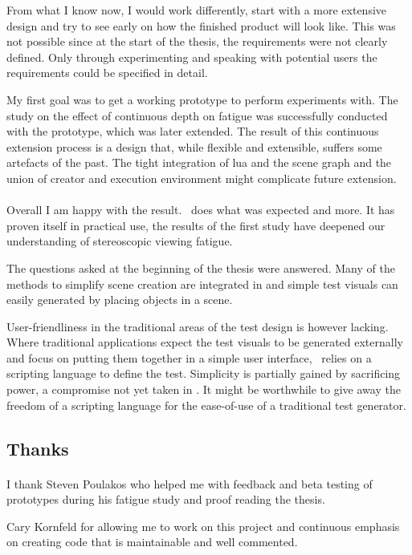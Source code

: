 From what I know now, I would work differently, start with a more extensive design and try to see early on how the finished product will look like.
This was not possible since at the start of the thesis, the requirements were not clearly defined.
Only through experimenting and speaking with potential users the requirements could be specified in detail.

My first goal was to get a working prototype to perform experiments with.
The study on the effect of continuous depth on fatigue was successfully conducted with the prototype, which was later extended.
The result of this continuous extension process is a design that, while flexible and extensible, suffers some artefacts of the past.
The tight integration of lua and the scene graph and the union of creator and execution environment might complicate future extension.

\paragraph{}
Overall I am happy with the result.
\ER\ does what was expected and more.
It has proven itself in practical use, the results of the first study have deepened our understanding of stereoscopic viewing fatigue.

The questions asked at the beginning of the thesis were answered.
Many of the methods to simplify scene creation are integrated in \ER and
simple test visuals can easily generated by placing objects in a scene.

User-friendliness in the traditional areas of the test design is however lacking.
Where traditional applications expect the test visuals to be generated externally and focus on putting them together in a simple user interface, \ER\ relies on a scripting language to define the test.
Simplicity is partially gained by sacrificing power, a compromise not yet taken in \ER.
It might be worthwhile to give away the freedom of a scripting language for the ease-of-use of a traditional test generator.

\clearpage

\subsection*{Thanks}
\paragraph{}
I thank Steven Poulakos who helped me with feedback and beta testing of prototypes during his fatigue study and proof reading the thesis.

Cary Kornfeld for allowing me to work on this project and continuous emphasis on creating code that is maintainable and well commented.

